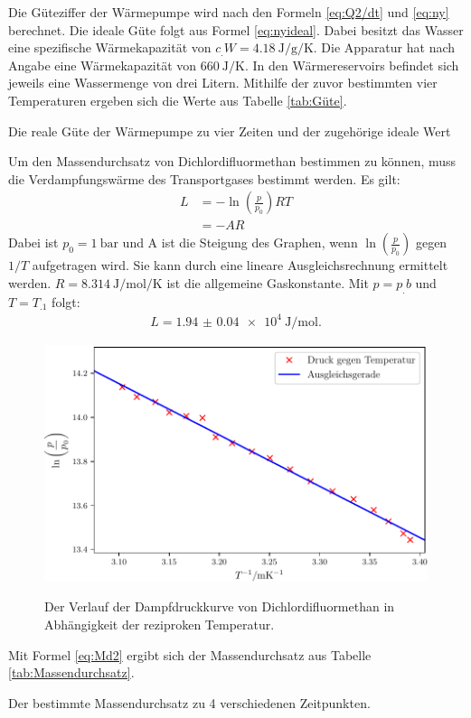 Die Güteziffer der Wärmepumpe wird nach den Formeln \eqref{eq:Q2/dt} und \eqref{eq:ny} berechnet. Die ideale Güte folgt aus Formel \eqref{eq:nyideal}. 
Dabei besitzt das Wasser eine spezifische Wärmekapazität von $c_.W=\SI{4.18}{\joule\per\gram\per\kelvin}$\cite{V201}. Die Apparatur hat nach Angabe eine Wärmekapazität von $\SI{660}{\joule\per\kelvin}$. In den Wärmereservoirs befindet sich jeweils eine Wassermenge von drei Litern. Mithilfe der zuvor bestimmten vier Temperaturen ergeben sich die Werte aus Tabelle \ref{tab:Güte}. 
\begin{table}
	\centering
	\caption{Die reale Güte der Wärmepumpe zu vier Zeiten und der zugehörige ideale Wert}
 	\label{tab:Güte}
\end{table}
\newline
\noindent Um den Massendurchsatz von Dichlordifluormethan bestimmen zu können, muss die Verdampfungswärme des Transportgases bestimmt werden. Es gilt:
\begin{align*}
 	 L &= -\ln\left(\frac{p}{p_0}\right) RT\\
	    &= - A R
\end{align*}
Dabei ist $p_0 = \SI{1}{\bar}$ und A ist die Steigung des Graphen, wenn $\ln\left(\frac{p}{p_0}\right)$ gegen $1/T$ aufgetragen wird. Sie kann durch eine lineare Ausgleichsrechnung ermittelt werden. $R = \SI{8.314}{\joule\per\mol\per\kelvin}$ \cite{R} ist die allgemeine Gaskonstante.
Mit $p=p_.b$ und $T=T_.1$ folgt:
\begin{align*}
 	 L = \SI{1.94(4)e+4}{\joule\per\mol}\text{.}
\end{align*}
\begin{figure}
 	\centering
 	\caption{Der Verlauf der Dampfdruckkurve von Dichlordifluormethan in Abhängigkeit der reziproken Temperatur.}
 	\includegraphics[width=\linewidth-70pt,height=\textheight-70pt,keepaspectratio]{content/images/Dampfdruck.pdf}
 	\label{fig:Dampfdruck}
\end{figure}
\newline
\noindent Mit Formel \eqref{eq:Md2} ergibt sich der Massendurchsatz aus Tabelle \ref{tab:Massendurchsatz}.
 \begin{table}
   	\centering
   	\caption{Der bestimmte Massendurchsatz zu 4 verschiedenen Zeitpunkten.}
   	\label{tab:Massendurchsatz}
 \end{table}

